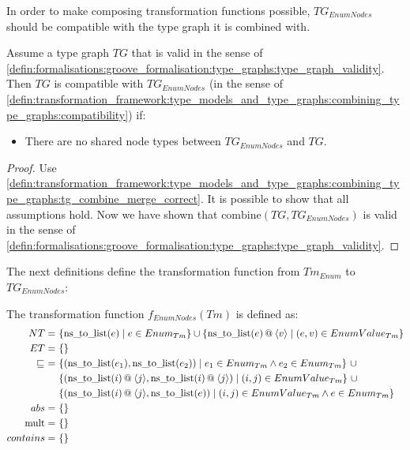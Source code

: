 In order to make composing transformation functions possible, $TG_{EnumNodes}$ should be compatible with the type graph it is combined with.

\begin{thm}
\label{defin:library_of_transformations:type_level_transformations:enumeration_types:tg_enum_as_node_types_combine_correct}
Assume a type graph $TG$ that is valid in the sense of \cref{defin:formalisations:groove_formalisation:type_graphs:type_graph_validity}. Then $TG$ is compatible with $TG_{EnumNodes}$ (in the sense of \cref{defin:transformation_framework:type_models_and_type_graphs:combining_type_graphs:compatibility}) if:
\begin{itemize}
    \item There are no shared node types between $TG_{EnumNodes}$ and $TG$.
\end{itemize}
\end{thm}

\begin{proof}
Use \cref{defin:transformation_framework:type_models_and_type_graphs:combining_type_graphs:tg_combine_merge_correct}. It is possible to show that all assumptions hold. Now we have shown that $\mathrm{combine}(TG, TG_{EnumNodes})$ is valid in the sense of \cref{defin:formalisations:groove_formalisation:type_graphs:type_graph_validity}.
\end{proof}

The next definitions define the transformation function from $Tm_{Enum}$ to $TG_{EnumNodes}$:

\begin{defin}
\label{defin:library_of_transformations:type_level_transformations:enumeration_types:tmod_enum_to_tg_enum_as_node_types}
The transformation function $f_{EnumNodes}(Tm)$ is defined as:
\begin{align*}
NT =\ &\{\mathrm{ns\_\!to\_\!list}(e) \mid e \in Enum_{Tm}\} \cup \{\mathrm{ns\_\!to\_\!list}(e) \append \langle v \rangle \mid (e, v) \in EnumValue_{Tm}\} \\
ET =\ &\{\} \\
\!\!\sqsubseteq\ =\ &\{(\mathrm{ns\_\!to\_\!list}(e_1), \mathrm{ns\_\!to\_\!list}(e_2)) \mid e_1 \in Enum_{Tm} \land e_2 \in Enum_{Tm} \}\ \cup \\&
\{(\mathrm{ns\_\!to\_\!list}(i) \append \langle j \rangle, \mathrm{ns\_\!to\_\!list}(i) \append \langle j \rangle) \mid (i, j) \in EnumValue_{Tm} \}\ \cup \\&
\{(\mathrm{ns\_\!to\_\!list}(i) \append \langle j \rangle, \mathrm{ns\_\!to\_\!list}(e)) \mid (i, j) \in EnumValue_{Tm} \land e \in Enum_{Tm} \} \\
abs =\ &\{\} \\
\mathrm{mult} =\ &\{\} \\
contains =\ &\{\}
\end{align*}
\end{defin}

